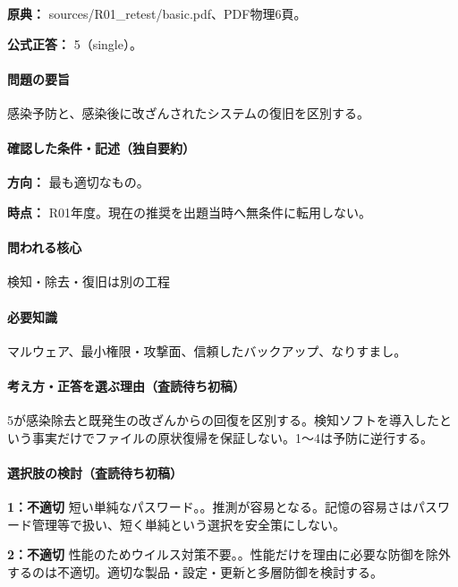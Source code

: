 \noindent\textbf{原典：} sources/R01\_retest/basic.pdf、PDF物理6頁。

\textbf{公式正答：} 5（single）。

\paragraph{問題の要旨} 感染予防と、感染後に改ざんされたシステムの復旧を区別する。

\paragraph{確認した条件・記述（独自要約）}\mbox{}\par

\noindent\textbf{方向：} 最も適切なもの。\par

\noindent\textbf{時点：} R01年度。現在の推奨を出題当時へ無条件に転用しない。\par

\paragraph{問われる核心} 検知・除去・復旧は別の工程

\paragraph{必要知識} マルウェア、最小権限・攻撃面、信頼したバックアップ、なりすまし。

\paragraph{考え方・正答を選ぶ理由（査読待ち初稿）} 5が感染除去と既発生の改ざんからの回復を区別する。検知ソフトを導入したという事実だけでファイルの原状復帰を保証しない。1〜4は予防に逆行する。

\paragraph{選択肢の検討（査読待ち初稿）}\mbox{}\par

\noindent\textbf{1：不適切} 短い単純なパスワード。。推測が容易となる。記憶の容易さはパスワード管理等で扱い、短く単純という選択を安全策にしない。\par

\noindent\textbf{2：不適切} 性能のためウイルス対策不要。。性能だけを理由に必要な防御を除外するのは不適切。適切な製品・設定・更新と多層防御を検討する。\par

